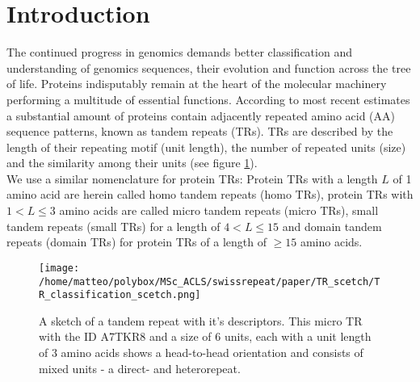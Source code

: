 \documentclass[a4,center,fleqn]{NAR}
\begin{document}
\section{Introduction}
The continued progress in genomics demands better classification and understanding of genomics sequences, their evolution and function across the tree of life. Proteins indisputably remain at the heart of the molecular machinery performing a multitude of essential functions. 
According to most recent estimates a substantial amount of proteins contain adjacently repeated amino acid (AA) sequence patterns, known as tandem repeats (TRs).  
TRs are described by the length of their repeating motif (unit length), the number of repeated units (size) and the similarity among their units \cite{Schaper2015} (see figure \ref{figSketchTR}). \\
We use a similar nomenclature for protein TRs: Protein TRs with a length $L$ of 1 amino acid are herein called homo tandem repeats (homo TRs), protein TRs with $1 < L \leq 3$ amino acids are called micro tandem repeats (micro TRs), small tandem repeats (small TRs) for a length of $4<L\leq15$ and domain tandem repeats (domain TRs) for protein TRs of a length of $\geq 15$ amino acids. 

\begin{figure}[t]
\begin{center}
\texttt{[image: /home/matteo/polybox/MSc\_ACLS/swissrepeat/paper/TR\_scetch/TR\_classification\_scetch.png]}
\end{center}
\caption{A sketch of a tandem repeat with it's descriptors. This micro TR with the ID A7TKR8 and a size of 6 units, each with a unit length of 3 amino acids shows a head-to-head orientation and consists of mixed units - a direct- and heterorepeat.}
\label{figSketchTR}
\end{figure}
\end{document}
